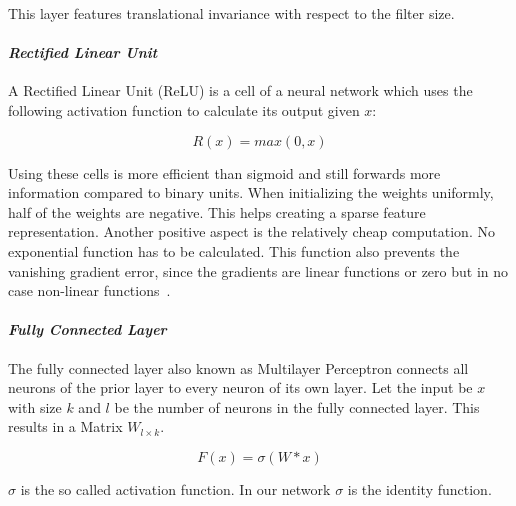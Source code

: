 This layer features translational invariance with respect to the filter size.

\paraV
\paragraph{\textit{Rectified Linear Unit}}
A Rectified Linear Unit (ReLU) is a cell of a neural network which uses the following activation function to calculate its output given $x$:


\begin{center}
\begin{minipage}{0.44\columnwidth}
\begin{equation}
R(x) = max(0, x)
\end{equation}
\end{minipage}
\end{center}


Using these cells is more efficient than sigmoid and still forwards more information compared to binary units. When initializing the weights uniformly, half of the weights are negative. This helps creating a sparse feature representation. Another positive aspect is the relatively cheap computation. No exponential function has to be calculated. This function also prevents the vanishing gradient error, since the gradients are linear functions or zero but in no case non-linear functions~\cite{AISTATS2011_GlorotBB11}.


\paraV
\paragraph{\textit{Fully Connected Layer}}

The fully connected layer also known as Multilayer Perceptron connects all neurons of the prior layer to every neuron of its own layer. Let the input be $x$ with size $k$ and $l$ be the number of neurons in the fully connected layer. This results in a Matrix $W_{l \times k}$.

\begin{center}
\begin{minipage}{0.4\columnwidth}
\begin{equation}
F(x) = \sigma(W*x)
\end{equation}
\end{minipage}
\end{center}

$\sigma$ is the so called activation function. In our network $\sigma$ is the identity function. 

